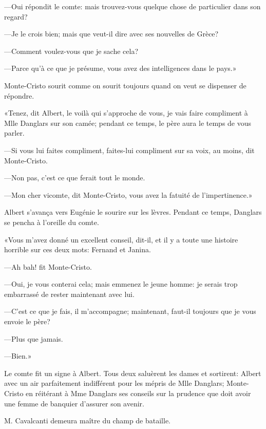 —Oui répondit le comte: mais trouvez-vous quelque chose de particulier dans son regard? 

—Je le crois bien; mais que veut-il dire avec ses nouvelles de Grèce? 

—Comment voulez-vous que je sache cela? 

—Parce qu'à ce que je présume, vous avez des intelligences dans le pays.» 

Monte-Cristo sourit comme on sourit toujours quand on veut se dispenser de répondre. 

«Tenez, dit Albert, le voilà qui s'approche de vous, je vais faire compliment à Mlle Danglars sur son camée; pendant ce temps, le père aura le temps de vous parler. 

—Si vous lui faites compliment, faites-lui compliment sur sa voix, au moins, dit Monte-Cristo. 

—Non pas, c'est ce que ferait tout le monde. 

—Mon cher vicomte, dit Monte-Cristo, vous avez la fatuité de l'impertinence.»  

Albert s'avança vers Eugénie le sourire sur les lèvres. Pendant ce temps, Danglars se pencha à l'oreille du comte. 

«Vous m'avez donné un excellent conseil, dit-il, et il y a toute une histoire horrible sur ces deux mots: Fernand et Janina. 

—Ah bah! fit Monte-Cristo. 

—Oui, je vous conterai cela; mais emmenez le jeune homme: je serais trop embarrassé de rester maintenant avec lui. 

—C'est ce que je fais, il m'accompagne; maintenant, faut-il toujours que je vous envoie le père? 

—Plus que jamais. 

—Bien.» 

Le comte fit un signe à Albert. Tous deux saluèrent les dames et sortirent: Albert avec un air parfaitement indifférent pour les mépris de Mlle Danglars; Monte-Cristo en réitérant à Mme Danglars ses conseils sur la prudence que doit avoir une femme de banquier d'assurer son avenir. 

M. Cavalcanti demeura maître du champ de bataille. 